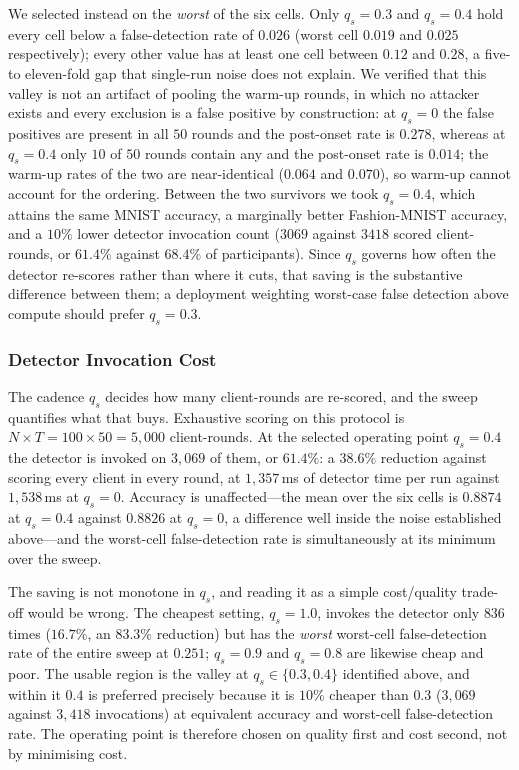 \documentclass[journal]{IEEEtran}
\begin{document}
We selected instead on the \emph{worst} of the six cells. Only $q_s = 0.3$ and $q_s = 0.4$ hold every cell below a false-detection rate of $0.026$ (worst cell $0.019$ and $0.025$ respectively); every other value has at least one cell between $0.12$ and $0.28$, a five- to eleven-fold gap that single-run noise does not explain. We verified that this valley is not an artifact of pooling the warm-up rounds, in which no attacker exists and every exclusion is a false positive by construction: at $q_s = 0$ the false positives are present in all $50$ rounds and the post-onset rate is $0.278$, whereas at $q_s = 0.4$ only $10$ of $50$ rounds contain any and the post-onset rate is $0.014$; the warm-up rates of the two are near-identical ($0.064$ and $0.070$), so warm-up cannot account for the ordering. Between the two survivors we took $q_s = 0.4$, which attains the same MNIST accuracy, a marginally better Fashion-MNIST accuracy, and a $10\%$ lower detector invocation count ($3069$ against $3418$ scored client-rounds, or $61.4\%$ against $68.4\%$ of participants). Since $q_s$ governs how often the detector re-scores rather than where it cuts, that saving is the substantive difference between them; a deployment weighting worst-case false detection above compute should prefer $q_s = 0.3$.


\subsubsection{Detector Invocation Cost}
\label{sec:invocation_cost}
The cadence $q_s$ decides how many client-rounds are re-scored, and the sweep quantifies what
that buys. Exhaustive scoring on this protocol is $N \times T = 100 \times 50 = 5{,}000$
client-rounds. At the selected operating point $q_s = 0.4$ the detector is invoked on
$3{,}069$ of them, or $61.4\%$: a $38.6\%$ reduction against scoring every client in every
round, at $1{,}357$\,ms of detector time per run against $1{,}538$\,ms at $q_s = 0$. Accuracy
is unaffected---the mean over the six cells is $0.8874$ at $q_s = 0.4$ against $0.8826$ at
$q_s = 0$, a difference well inside the noise established above---and the worst-cell
false-detection rate is simultaneously at its minimum over the sweep.

The saving is not monotone in $q_s$, and reading it as a simple cost/quality trade-off would
be wrong. The cheapest setting, $q_s = 1.0$, invokes the detector only $836$ times
($16.7\%$, an $83.3\%$ reduction) but has the \emph{worst} worst-cell false-detection rate of
the entire sweep at $0.251$; $q_s = 0.9$ and $q_s = 0.8$ are likewise cheap and poor. The
usable region is the valley at $q_s \in \{0.3, 0.4\}$ identified above, and within it $0.4$
is preferred precisely because it is $10\%$ cheaper than $0.3$ ($3{,}069$ against $3{,}418$
invocations) at equivalent accuracy and worst-cell false-detection rate. The operating point
is therefore chosen on quality first and cost second, not by minimising cost.
\end{document}
